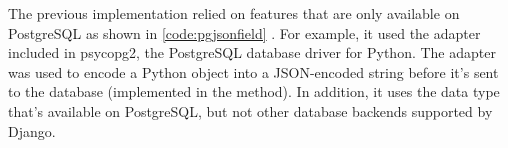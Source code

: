 

The previous implementation relied on features that are only available on
PostgreSQL as shown in \autoref{code:pgjsonfield} \cite{django:pgjsonfield}.
For example, it used the  adapter included in psycopg2, the
PostgreSQL database driver for Python. The adapter was used to encode a Python
object into a JSON-encoded string before it's sent to the database (implemented
in the  method). In addition, it uses the 
data type that's available on PostgreSQL, but not other database backends
supported by Django.
